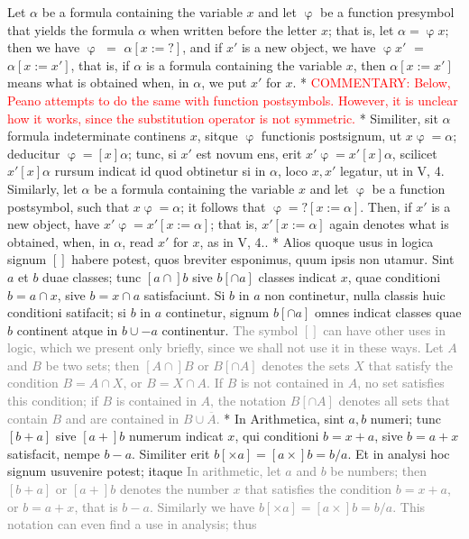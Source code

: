 \documentclass{book}
\newcommand\irrelavent[1]{\textcolor{gray}{#1}}
\newcommand\commentary[1]{\textcolor{red}{COMMENTARY: #1}}
\newenvironment{translateTwoCol}
               { %
                 \columnratio{0.5, 0.5}
                 \begin{paracol}{2}
                 \newcommand{\LAT}{\switchcolumn[0]*}
                 \newcommand{\ENG}{\switchcolumn[1]}
               }
               { %
                 \let\ENG\undefined
                 \let\LAT\undefined
                 \end{paracol}
               }
\begin{document}
\begin{translateTwoCol}
\ENG
Let $\alpha$ be a formula containing the variable $x$ and let $\upvarphi$ be a function presymbol that yields the formula $\alpha$ when written before the letter $x$; that is, let $\alpha = \upvarphi x$; then we have $\upvarphi$ $=$ $\alpha [x := ? ]$, and if $x'$ is a new object, we have $\upvarphi x'$ $=$ $\alpha [x := x']$, that is, if $\alpha$ is a formula containing the variable $x$, then $\alpha[x := x']$ means what is obtained when, in $\alpha$, we put $x'$ for $x$.
\LAT
\ENG
\commentary{Below, Peano attempts to do the same with function postsymbols.  However, it is unclear how it works, since the substitution operator is not symmetric.}
\LAT
Similiter, sit $\alpha$ formula indeterminate continens $x$, sitque $\upvarphi$ functionis postsignum, ut $x \upvarphi = \alpha$; deducitur $\upvarphi = [x] \alpha$; tunc, si $x'$ est novum ens, erit $x' \upvarphi = x' [x] \alpha$, scilicet $x' [x] \alpha$ rursum indicat id quod obtinetur si in $\alpha$, loco $x, x'$ legatur, ut in V, 4.
\ENG
Similarly, let $\alpha$ be a formula containing the variable $x$ and let $\upvarphi$ be a function postsymbol, such that $x\upvarphi = \alpha$; it follows that $\upvarphi = ?[x := \alpha]$. Then, if $x'$ is a new object, have $x' \upvarphi = x'[x := \alpha]$; that is, $x'[x := \alpha]$ again denotes what is obtained, when, in $\alpha$, read $x'$ for $x$, as in V, 4..
\LAT
Alios quoque usus in logica signum $[ ]$ habere potest, quos breviter esponimus, quum ipsis non utamur. Sint $a$ et $b$ duae classes; tunc $[a \cap ]b$ sive $b[ \cap a]$ classes indicat $x$, quae conditioni $b = a \cap x$, sive $b = x \cap a$ satisfaciunt. Si $b$ in $a$ non continetur, nulla classis huic conditioni satifacit; si $b$ in $a$ continetur, signum $b [ \cap a ]$ omnes indicat classes quae $b$ continent atque in $b \cup - a$ continentur.
\ENG
\irrelavent{The symbol $[ ]$ can have other uses in logic, which we present only briefly, since we shall not use it in these ways. Let $A$ and $B$ be two sets; then $[A \cap ]B$ or $B[ \cap A]$ denotes the sets $X$ that satisfy the condition $B = A \cap X$, or $B = X \cap A$. If $B$ is not contained in $A$, no set satisfies this condition; if $B$ is contained in $A$, the notation $B [ \cap A ]$ denotes all sets that contain $B$ and are contained in $B \cup  \overline{A}$.} %
\LAT
In Arithmetica, sint $a, b$ numeri; tunc $[b + a]$ sive $[a +] b$ numerum indicat $x$, qui conditioni $b = x + a$, sive $b = a + x$ satisfacit, nempe $b - a$. Similiter erit $b [ \times a ] = [a \times ] b = b / a$. Et in analysi hoc signum usuvenire potest; itaque
\ENG
\irrelavent{In arithmetic, let $a$ and $b$ be numbers; then $[b + a]$ or $[a +] b$ denotes the number $x$ that satisfies the condition $b = x + a$, or $b = a + x$, that is $b - a$. Similarly we have $b [ \times a ] = [a \times ] b = b / a$. This notation can even find a use in analysis; thus} %
\end{translateTwoCol}
\end{document}

